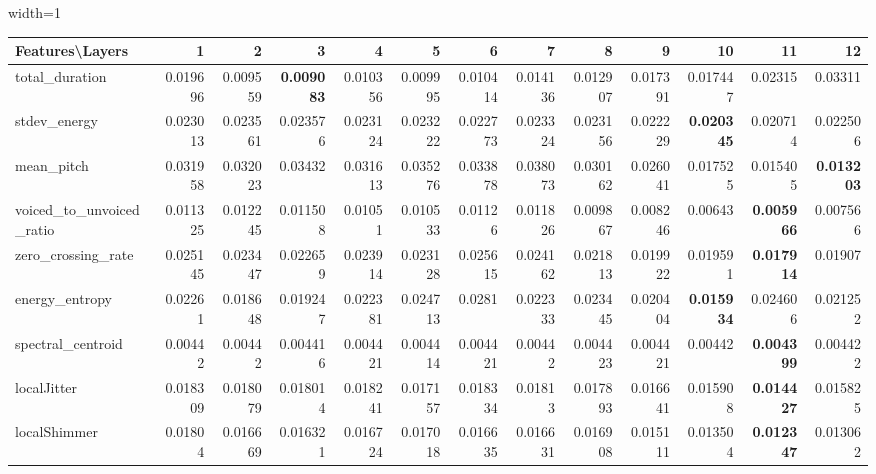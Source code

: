 \documentclass[sigconf]{acmart}
\newcommand{\mj}{Mockingjay\xspace}
\begin{document}
\begin{table*}[]
\begin{adjustbox}{width=1\textwidth}
\begin{tabular}{@{}l|rrrrrrrrrrrr@{}}
\toprule
\textbf{Features\textbackslash{}Layers} & 1 & 2 & 3 & 4 & 5 & 6 & 7 & 8 & 9 & 10 & 11 & 12 \\ \midrule
total\_duration & 0.019696 & 0.009559 & \textbf{0.009083} & 0.010356 & 0.009995 & 0.010414 & 0.014136 & 0.012907 & 0.017391 & 0.017447 & 0.02315 & 0.03311 \\
stdev\_energy & 0.023013 & 0.023561 & 0.023576 & 0.023124 & 0.023222 & 0.022773 & 0.023324 & 0.023156 & 0.022229 & \textbf{0.020345} & 0.020714 & 0.022506 \\
mean\_pitch & 0.031958 & 0.032023 & 0.03432 & 0.031613 & 0.035276 & 0.033878 & 0.038073 & 0.030162 & 0.026041 & 0.017525 & 0.015405 & \textbf{0.013203} \\
voiced\_to\_unvoiced\_ratio & 0.011325 & 0.012245 & 0.011508 & 0.01051 & 0.010533 & 0.01126 & 0.011826 & 0.009867 & 0.008246 & 0.00643 & \textbf{0.005966} & 0.007566 \\
zero\_crossing\_rate & 0.025145 & 0.023447 & 0.022659 & 0.023914 & 0.023128 & 0.025615 & 0.024162 & 0.021813 & 0.019922 & 0.019591 & \textbf{0.017914} & 0.01907 \\
energy\_entropy & 0.02261 & 0.018648 & 0.019247 & 0.022381 & 0.024713 & 0.0281 & 0.022333 & 0.023445 & 0.020404 & \textbf{0.015934} & 0.024606 & 0.021252 \\
spectral\_centroid & 0.00442 & 0.00442 & 0.004416 & 0.004421 & 0.004414 & 0.004421 & 0.00442 & 0.004423 & 0.004421 & 0.00442 & \textbf{0.004399} & 0.004422 \\
localJitter & 0.018309 & 0.018079 & 0.018014 & 0.018241 & 0.017157 & 0.018334 & 0.01813 & 0.017893 & 0.016641 & 0.015908 & \textbf{0.014427} & 0.015825 \\
localShimmer & 0.01804 & 0.016669 & 0.016321 & 0.016724 & 0.017018 & 0.016635 & 0.016631 & 0.016908 & 0.015111 & 0.013504 & \textbf{0.012347} & 0.013062\\ \bottomrule
\end{tabular}
\end{adjustbox}
\vspace{1 mm}
\caption{\label{nsAudio_M}  \small Results (MSE) for audio features on {\mj} for native spontaneous speech corpus (Mozilla Common Voice)}

\end{table*}
\end{document}

